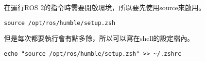 在運行ROS 2的指令時需要開啟環境，所以要先使用source來啟用。
\begin{verbatim}
source /opt/ros/humble/setup.zsh
\end{verbatim}
但是每次都要執行會有點多餘，所以可以寫在shell的設定檔內。
\begin{verbatim}
echo "source /opt/ros/humble/setup.zsh" >> ~/.zshrc
\end{verbatim}

